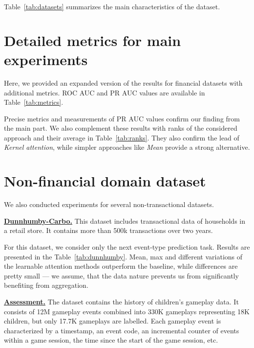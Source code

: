 Table~\ref{tab:datasets} summarizes the main characteristics of the dataset.


\section{Detailed metrics for main experiments} 
\label{sec:AppMainTable}

Here, we provided an expanded version of the results for financial datasets with additional metrics.
ROC AUC and PR AUC values are available in Table~\ref{tab:metrics}.


Precise metrics and measurements of PR AUC values confirm our finding from the main part.
We also complement these results with ranks of the considered approach and their average in Table~\ref{tab:ranks}.
They also confirm the lead of \emph{Kernel attention}, while simpler approaches like \emph{Mean} provide a strong alternative.



\section{Non-financial domain dataset}
\label{sec:other-data-results}
We also conducted experiments for several non-transactional datasets. 

% 

\href{https://www.dunnhumby.com/source-files/}{\textbf{Dunnhumby-Carbo.}} This dataset includes transactional data of households in a retail store. It contains more than 500k transactions over two years.

For this dataset, we consider only the next event-type prediction task. Results are presented in the Table~\ref{tab:dunnhumby}. Mean, max and different variations of the learnable attention methods outperform the baseline, while differences are pretty small --- we assume, that the data nature prevents us from significantly benefiting from aggregation.

\href{https://www.kaggle.com/c/data-science-bowl-2019}{\textbf{Assessment.}}
The dataset contains the history of children’s gameplay data. 
It consists of 12M gameplay events combined into 330K gameplays representing 18K children, but only 17.7K gameplays are labelled. 
Each gameplay event is characterized by a timestamp, an event code, an incremental counter of events within a game session, the time since the start of the game session, etc.

